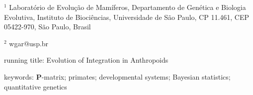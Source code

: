 $^1$ Laboratório de Evolução de Mamíferos, Departamento de Genética e Biologia Evolutiva, Instituto de Biociências, Universidade de São Paulo, CP 11.461, CEP 05422-970, São Paulo, Brasil

$^2$ wgar@usp.br

running title: Evolution of Integration in Anthropoids

keywords: $\mathbf{P}$-matrix; primates; developmental systems; Bayesian statistics; quantitative genetics


\linenumbers
\modulolinenumbers[1]

\doublespacing
